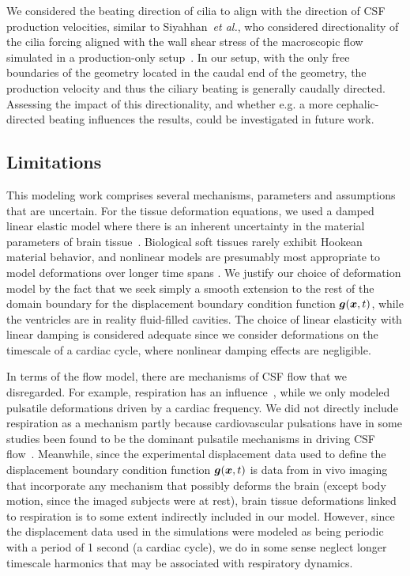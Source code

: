 \documentclass{template}
\begin{document}
We considered the beating direction of cilia to align with the direction of 
CSF production velocities, similar to Siyahhan~\emph{et al.}, who considered
directionality of the cilia forcing aligned
with the wall shear stress of the macroscopic flow simulated in a
production-only setup~\citep{Siyahhan2014FlowVentricles}.
In our setup, with the only free boundaries of the geometry located
in the caudal end of the geometry, the production velocity and thus
the ciliary beating is generally caudally directed. Assessing the impact
of this directionality, and whether e.g. a more cephalic-directed beating
influences the results, could be investigated in future work.

\subsection{Limitations}
\label{subsec:limitations}

This modeling work comprises several mechanisms, parameters and
assumptions that are uncertain.
For the tissue deformation equations, we used a damped linear elastic model
where there is an inherent
uncertainty in the material parameters
of brain tissue~\citep{smillie2005hydroelastic}.
Biological soft tissues rarely exhibit Hookean material behavior,
and nonlinear models are presumably most appropriate to
model deformations over longer time spans
\citep{Cheng2010ComputationalModel, Cheng2007UnconfinedCompression,
smillie2005hydroelastic, tully2009coupling, kaczmarek1997hydromechanics}.
We justify our choice of deformation model by the fact that
we seek simply a smooth extension to the rest of the domain boundary
for the displacement boundary condition function $\bm{g}(\bm{x}, t)$,
while the ventricles are in reality fluid-filled cavities.
The choice of linear elasticity with linear damping is considered
adequate since we consider deformations on the timescale of a cardiac cycle,
where nonlinear damping effects are negligible.

In terms of the flow model, there are mechanisms of CSF flow that we disregarded.
For example, respiration has an influence~\citep{Vinje2019RespiratoryMeasurements},
while we only modeled pulsatile deformations driven by a cardiac frequency.
We did not directly include respiration as a mechanism partly because cardiovascular pulsations
have in some studies been found to be the dominant pulsatile mechanisms
in driving CSF flow~\citep{Soderstrom2025}. Meanwhile, since the experimental displacement data
used to define the displacement boundary condition function $\bm{g}(\bm{x}, t)$ is data from
in vivo imaging that incorporate any mechanism that possibly deforms the brain 
(except body motion, since the imaged subjects were at rest), brain tissue deformations
linked to respiration is to some extent indirectly included in our model. However, since
the displacement data used in the simulations were modeled as being periodic with a
period of 1 second (a cardiac cycle), we do in some sense neglect
longer timescale harmonics that may be associated with respiratory dynamics.
\end{document}
